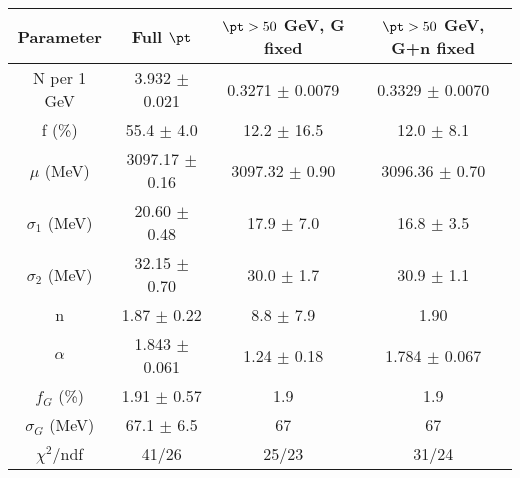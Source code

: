 \begin{tabular}{c||c|c|c}
Parameter & Full $\pt$ & $\pt>50$ GeV, G fixed & $\pt>50$ GeV, G+n fixed \\
\hline
N per 1 GeV & 3.932 $\pm$ 0.021 & 0.3271 $\pm$ 0.0079 & 0.3329 $\pm$ 0.0070\\
f (\%) & 55.4 $\pm$ 4.0 & 12.2 $\pm$ 16.5 & 12.0 $\pm$ 8.1\\
$\mu$ (MeV) & 3097.17 $\pm$ 0.16 & 3097.32 $\pm$ 0.90 & 3096.36 $\pm$ 0.70\\
$\sigma_1$ (MeV) & 20.60 $\pm$ 0.48 & 17.9 $\pm$ 7.0 & 16.8 $\pm$ 3.5\\
$\sigma_2$ (MeV) & 32.15 $\pm$ 0.70 & 30.0 $\pm$ 1.7 & 30.9 $\pm$ 1.1\\
n & 1.87 $\pm$ 0.22 & 8.8 $\pm$ 7.9 & 1.90\\
$\alpha$ & 1.843 $\pm$ 0.061 & 1.24 $\pm$ 0.18 & 1.784 $\pm$ 0.067\\
$f_G$ (\%) & 1.91 $\pm$ 0.57 & 1.9 & 1.9\\
$\sigma_G$ (MeV) & 67.1 $\pm$ 6.5 & 67 & 67\\
\hline
$\chi^2$/ndf & 41/26 & 25/23 & 31/24\\
\end{tabular}
